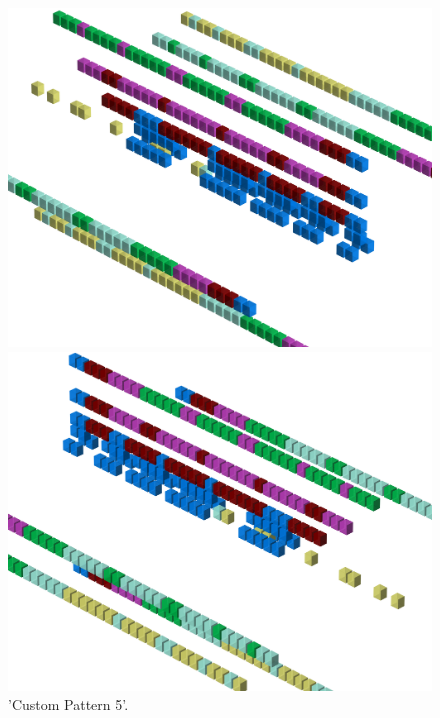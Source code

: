 \begin{figure}[H]
    \centering
    \begin{adjustbox}{width=12cm,center}
      \includegraphics[width=12cm]{src/patterns/pattern12-45.png}%
    \end{adjustbox}
    \begin{adjustbox}{width=12cm,margin=0cm -4cm}
      \includegraphics[width=12cm]{src/patterns/pattern12-225.png}%
    \end{adjustbox}
\caption{'Custom Pattern 5'.}
\end{figure}
\clearpage

